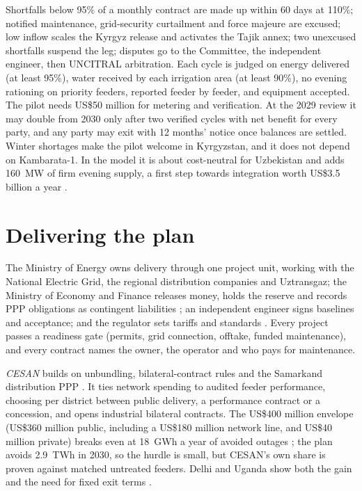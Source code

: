 \documentclass[11pt,letterpaper]{article}
\begin{document}
Shortfalls below 95\% of a monthly contract are made up within 60 days at 110\%; notified maintenance, grid-security curtailment and force majeure are excused; low inflow scales the Kyrgyz release and activates the Tajik annex; two unexcused shortfalls suspend the leg; disputes go to the Committee, the independent engineer, then UNCITRAL arbitration. Each cycle is judged on energy delivered (at least 95\%), water received by each irrigation area (at least 90\%), no evening rationing on priority feeders, reported feeder by feeder, and equipment accepted. The pilot needs US\$50 million for metering and verification. At the 2029 review it may double from 2030 only after two verified cycles with net benefit for every party, and any party may exit with 12 months' notice once balances are settled. Winter shortages make the pilot welcome in Kyrgyzstan, and it does not depend on Kambarata-1. In the model it is about cost-neutral for Uzbekistan and adds 160~MW of firm evening supply, a first step towards integration worth US\$3.5 billion a year \cite{agora}.

\section{Delivering the plan}\label{sec:delivery}

The Ministry of Energy owns delivery through one project unit, working with the National Electric Grid, the regional distribution companies and Uztransgaz; the Ministry of Economy and Finance releases money, holds the reserve and records PPP obligations as contingent liabilities \cite{imf-2026}; an independent engineer signs baselines and acceptance; and the regulator sets tariffs and standards \cite{emdra}. Every project passes a readiness gate (permits, grid connection, offtake, funded maintenance), and every contract names the owner, the operator and who pays for maintenance.

\textit{CESAN} builds on unbundling, bilateral-contract rules and the Samarkand distribution PPP \cite{samarkand-ppp,team-cesan}. It ties network spending to audited feeder performance, choosing per district between public delivery, a performance contract or a concession, and opens industrial bilateral contracts. The US\$400 million envelope (US\$360 million public, including a US\$180 million network line, and US\$40 million private) breaks even at 18~GWh a year of avoided outages \cite{wb-pad}; the plan avoids 2.9~TWh in 2030, so the hurdle is small, but CESAN's own share is proven against matched untreated feeders. Delhi and Uganda show both the gain and the need for fixed exit terms \cite{tata-delhi,umeme}.
\end{document}
